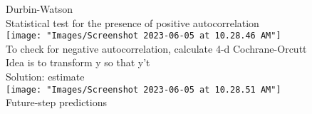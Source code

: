 \documentclass[17pt]{extarticle}%
\begin{document}
Durbin-Watson \\
Statistical test for the presence of positive autocorrelation \\
\texttt{[image: "Images/Screenshot 2023-06-05 at 10.28.46 AM"]} \\
To check for negative autocorrelation, calculate 4-d
Cochrane-Orcutt \\
Idea is to transform y so that y't \\
Solution: estimate\\
\texttt{[image: "Images/Screenshot 2023-06-05 at 10.28.51 AM"]}\\
Future-step predictions

	
\end{document}
